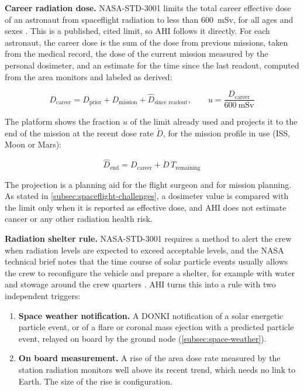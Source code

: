 \medskip\noindent\textbf{Career radiation dose.} NASA-STD-3001 limits the total career effective dose of an astronaut from spaceflight radiation to less than 600~mSv, for all ages and sexes \cite{nasa_ochmo_tb020_radiation}. This is a published, cited limit, so AHI follows it directly. For each astronaut, the career dose is the sum of the dose from previous missions, taken from the medical record, the dose of the current mission measured by the personal dosimeter, and an estimate for the time since the last readout, computed from the area monitors and labeled as derived:

\begin{equation}
D_{\text{career}}=D_{\text{prior}}+D_{\text{mission}}+\hat{D}_{\text{since readout}},\qquad
u=\frac{D_{\text{career}}}{600~\text{mSv}}
\end{equation}

The platform shows the fraction $u$ of the limit already used and projects it to the end of the mission at the recent dose rate $\dot{D}$, for the mission profile in use (ISS, Moon or Mars):

\begin{equation}
\hat{D}_{\text{end}}=D_{\text{career}}+\dot{D}\,T_{\text{remaining}}
\end{equation}

The projection is a planning aid for the flight surgeon and for mission planning. As stated in \ref{subsec:spaceflight-challenges}, a dosimeter value is compared with the limit only when it is reported as effective dose, and AHI does not estimate cancer or any other radiation health risk.

\medskip\noindent\textbf{Radiation shelter rule.} NASA-STD-3001 requires a method to alert the crew when radiation levels are expected to exceed acceptable levels, and the NASA technical brief notes that the time course of solar particle events usually allows the crew to reconfigure the vehicle and prepare a shelter, for example with water and stowage around the crew quarters \cite{nasa_ochmo_tb020_radiation}. AHI turns this into a rule with two independent triggers:

\begin{enumerate}
\item \textbf{Space weather notification.} A DONKI notification of a solar energetic particle event, or of a flare or coronal mass ejection with a predicted particle event, relayed on board by the ground node (\ref{subsec:space-weather}).
\item \textbf{On board measurement.} A rise of the area dose rate measured by the station radiation monitors well above its recent trend, which needs no link to Earth. The size of the rise is configuration.
\end{enumerate}

